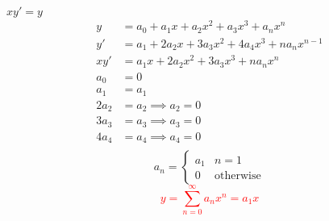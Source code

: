 \item $xy'=y$
\begin{align*}
    y &= a_0 + a_1x + a_2x^2 + a_3x^3 + a_nx^n\\
    y' &= a_1 + 2a_2x + 3a_3x^2 + 4a_4x^3 + na_nx^{n-1} \\
    xy' &= a_1x + 2a_2x^2 + 3a_3x^3 + na_nx^n \\
    a_0 &= 0 \\
    a_1 &= a_1\\
    2a_2 &= a_2 \implies a_2 = 0\\
    3a_3 &= a_3 \implies a_3 = 0\\
    4a_4 &= a_4 \implies a_4 = 0\\
\end{align*}
\[
a_n = 
\begin{cases}
    a_1 & n = 1\\
    0 & \text{otherwise}
\end{cases}
\]
\textcolor{red}{\[
    y 
    = \sum_{n=0}^\infty a_nx^n
    = a_1x
\]}